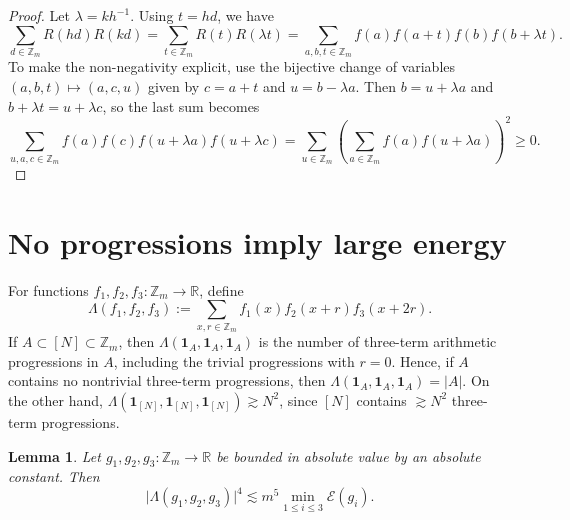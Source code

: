 \documentclass[11pt]{amsart}
\newcommand{\Z}{\mathbb{Z}}
\newcommand{\abs}[1]{\lvert#1\rvert}
\newcommand{\one}{\mathbf{1}}
\numberwithin{equation}{section}
\theoremstyle{plain}
\newtheorem{lemma}[theorem]{Lemma}
\theoremstyle{remark}
\begin{document}
\begin{proof}
Let $\lambda=kh^{-1}$. Using $t=hd$, we have
\[
\sum_{d\in\Z_m}R(hd)R(kd)=\sum_{t\in\Z_m}R(t)R(\lambda t)
=\sum_{a,b,t\in\Z_m} f(a)f(a+t)f(b)f(b+\lambda t).
\]
To make the non-negativity explicit, use the bijective change of variables
$(a,b,t)\mapsto(a,c,u)$ given by $c=a+t$ and $u=b-\lambda a$. Then
$b=u+\lambda a$ and $b+\lambda t=u+\lambda c$, so the last sum becomes
$$
\sum_{u,a,c\in\Z_m} f(a)f(c)f(u+\lambda a)f(u+\lambda c)
=\sum_{u\in\Z_m}\left(\sum_{a\in\Z_m}f(a)f(u+\lambda a)\right)^2\geq 0.
$$
\end{proof}

\section{No progressions imply large energy}

For functions $f_1,f_2,f_3\colon\Z_m\to\mathbb R$, define
$$
\Lambda(f_1,f_2,f_3):=\sum_{x,r\in\Z_m} f_1(x)f_2(x+r)f_3(x+2r).
$$
If $A\subset [N]\subset\Z_m$, then $\Lambda(\one_A,\one_A,\one_A)$ is the
number of three-term arithmetic progressions in $A$, including the trivial
progressions with $r=0$. Hence, if $A$ contains no nontrivial three-term
progressions, then $\Lambda(\one_A,\one_A,\one_A)=\abs{A}$. On the other hand,
$\Lambda(\one_{[N]},\one_{[N]},\one_{[N]})\gtrsim N^2$, since $[N]$ contains
$\gtrsim N^2$ three-term progressions.

\begin{lemma}\label{lem:lambda-energy}
Let $g_1,g_2,g_3\colon\Z_m\to\mathbb R$ be bounded in absolute value by an
absolute constant. Then
\[
        \abs{\Lambda(g_1,g_2,g_3)}^4
        \lesssim m^5\min_{1\leq i\leq3}\mathcal E(g_i).
\]
\end{lemma}
\end{document}
